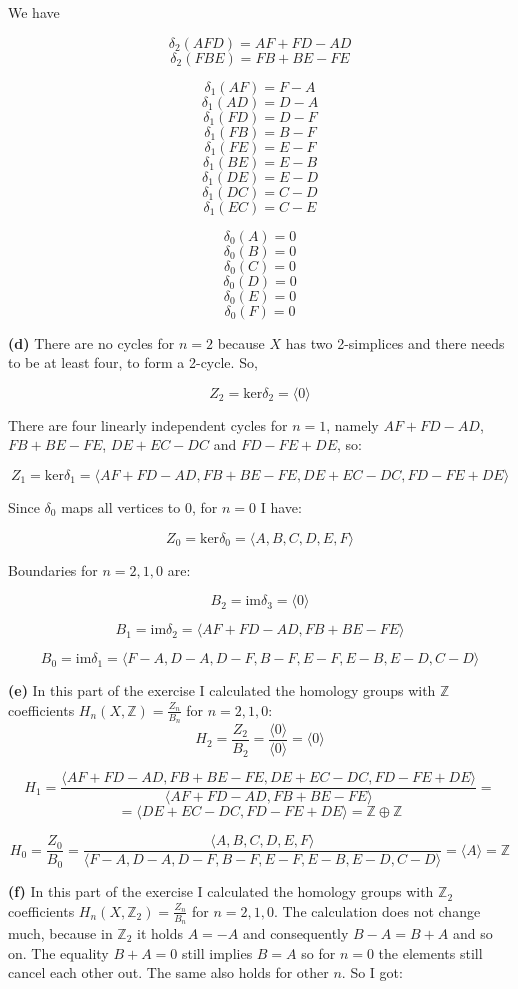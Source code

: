 \documentclass[12pt]{article}
\begin{document}
	We have 
	
	$$\delta_2(AFD) = AF + FD - AD$$
	$$\delta_2(FBE) = FB + BE - FE$$
	
	$$\delta_1(AF) = F-A$$
	$$\delta_1(AD) = D-A$$
	$$\delta_1(FD) = D-F$$
	$$\delta_1(FB) = B-F$$
	$$\delta_1(FE) = E-F$$
	$$\delta_1(BE) = E-B$$
	$$\delta_1(DE) = E-D$$
	$$\delta_1(DC) = C-D$$
	$$\delta_1(EC) = C-E$$
	
	$$\delta_0(A) = 0$$
	$$\delta_0(B) = 0$$
	$$\delta_0(C) = 0$$
	$$\delta_0(D) = 0$$
	$$\delta_0(E) = 0$$
	$$\delta_0(F) = 0$$
	
		\textbf{(d)}
		There are no cycles for $n=2$ because $X$ has two 2-simplices and there needs to be at least four, to form a 2-cycle. So,
		
		$$Z_2 = \text{ker}\delta_2 = \langle 0 \rangle $$
		
		There are four linearly independent cycles for $n=1$, namely $AF + FD - AD$, $FB + BE - FE$, $DE + EC - DC$ and $FD - FE + DE$, so: 
		
		$$Z_1 = \text{ker}\delta_1 = \langle AF + FD - AD, FB + BE - FE, DE + EC - DC,
		FD - FE + DE  \rangle $$
		
		Since $\delta_0$ maps all vertices to 0, for $n=0$ I have: 
		
		$$Z_0 = \text{ker}\delta_0 = \langle A, B, C, D, E, F \rangle$$
		
		Boundaries for $n=2,1,0$ are:
		
		$$B_2 = \text{im} \delta_3 = \langle 0 \rangle$$
		
		$$B_1 = \text{im} \delta_2 = \langle AF + FD - AD, FB + BE - FE \rangle$$
		
		$$B_0 = \text{im} \delta_1 = \langle F-A,D-A,D-F,B-F,E-F,E-B,E-D,C-D \rangle $$
		
		\textbf{(e)}	
		In this part of the exercise I calculated the homology groups with $\mathbb{Z}$ coefficients $H_n(X,\mathbb{Z})=\frac{Z_n}{B_n}$ for $n=2,1,0$:
		$$H_2=\frac{Z_2}{B_2}=\frac{\langle 0 \rangle}{\langle 0 \rangle}=\langle 0 \rangle$$
		
		$$H_1=\frac{\langle AF + FD - AD, FB + BE - FE, DE + EC - DC,
			FD - FE + DE  \rangle}{\langle AF + FD - AD, FB + BE - FE \rangle} = $$
		$$  = \langle DE + EC - DC, FD - FE + DE \rangle = \mathbb{Z} \oplus \mathbb{Z}$$
		
		$$H_0=\frac{Z_0}{B_0}=\frac{\langle A, B, C, D, E, F \rangle}{\langle F-A,D-A,D-F,B-F,E-F,E-B,E-D,C-D \rangle}= \langle A \rangle = \mathbb{Z}$$	
		
		\textbf{(f)} In this part of the exercise I calculated the homology groups with $\mathbb{Z}_2$ coefficients $H_n(X,\mathbb{Z}_2)=\frac{Z_n}{B_n}$ for $n=2,1,0$. The calculation does not change much, because in $\mathbb{Z}_2$ it holds $A=-A$ and consequently $B-A=B+A$ and so on. The equality $B+A=0$ still implies $B=A$ so for $n=0$ the elements still cancel each other out. The same also holds for other $n$. So I got: 
		
\end{document}
